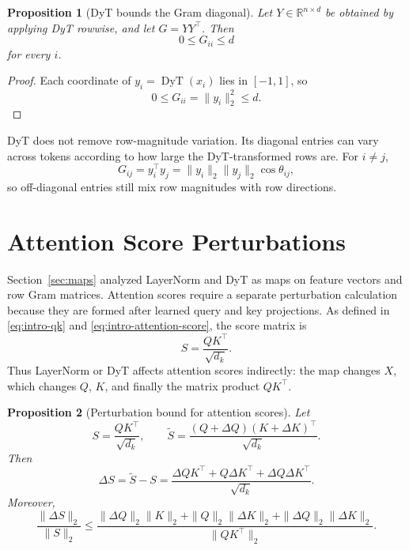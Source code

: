 \documentclass[11pt]{article}
\newtheorem{proposition}{Proposition}
\newcommand{\R}{\mathbb{R}}
\newcommand{\DyT}{\operatorname{DyT}}
\begin{document}
\begin{proposition}[DyT bounds the Gram diagonal]
Let \(Y\in\R^{n\times d}\) be obtained by applying DyT rowwise, and let \(G=YY^\top\). Then
\begin{equation}
    0\leq G_{ii}\leq d
\label{eq:dyt-gram-diagonal}
\end{equation}
for every \(i\).
\end{proposition}

\begin{proof}
Each coordinate of \(y_i=\DyT(x_i)\) lies in \([-1,1]\), so
\[
    0\leq G_{ii}=\|y_i\|_2^2\leq d.
\]
\end{proof}

DyT does not remove row-magnitude variation. Its diagonal entries can vary across tokens according to how large the DyT-transformed rows are. For \(i\neq j\),
\[
    G_{ij}=y_i^\top y_j=\|y_i\|_2\|y_j\|_2\cos\theta_{ij},
\]
so off-diagonal entries still mix row magnitudes with row directions.
\section{Attention Score Perturbations}
\label{sec:perturbation}

Section~\ref{sec:maps} analyzed LayerNorm and DyT as maps on feature vectors and row Gram matrices. Attention scores require a separate perturbation calculation because they are formed after learned query and key projections. As defined in \eqref{eq:intro-qk} and \eqref{eq:intro-attention-score}, the score matrix is
\[
    S=\frac{QK^\top}{\sqrt{d_k}}.
\]
Thus LayerNorm or DyT affects attention scores indirectly: the map changes \(X\), which changes \(Q\), \(K\), and finally the matrix product \(QK^\top\).

\begin{proposition}[Perturbation bound for attention scores]
Let
\[
    S=\frac{QK^\top}{\sqrt{d_k}},
    \qquad
    \widetilde S
    =
    \frac{(Q+\Delta Q)(K+\Delta K)^\top}{\sqrt{d_k}}.
\]
Then
\[
    \Delta S
    =
    \widetilde S-S
    =
    \frac{
        \Delta QK^\top
        +
        Q\Delta K^\top
        +
        \Delta Q\Delta K^\top
    }{\sqrt{d_k}}.
\]
Moreover,
\begin{equation}
    \frac{\|\Delta S\|_2}{\|S\|_2}
    \leq
    \frac{
        \|\Delta Q\|_2\|K\|_2
        +
        \|Q\|_2\|\Delta K\|_2
        +
        \|\Delta Q\|_2\|\Delta K\|_2
    }{
        \|QK^\top\|_2
    }.
\label{eq:attention-relative-perturbation}
\end{equation}
\end{proposition}
\end{document}

